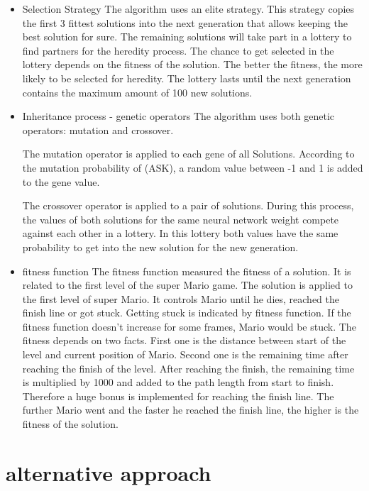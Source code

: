 \documentclass[a4paper]{article}
\begin{document}
\begin{itemize}

\item{Selection Strategy}
The algorithm uses an elite strategy. This strategy copies the first 3 fittest solutions into the next generation that allows keeping the best solution for sure. The remaining solutions will take part in a lottery to find partners for the heredity process. The chance to get selected in the lottery depends on the fitness of the solution. The better the fitness, the more likely to be selected for heredity. The lottery lasts until the next generation contains the maximum amount of 100 new solutions.


\item{Inheritance process - genetic operators}
The algorithm uses both genetic operators: mutation and crossover.

The mutation operator is applied to each gene of all Solutions. According to the mutation probability of (ASK), a random value between -1 and 1 is added to the gene value.

The crossover operator is applied to a pair of solutions. During this process, the values of both solutions for the same neural network weight compete against each other in a lottery. In this lottery both values have the same probability to get into the new solution for the new generation.

\item{fitness function}
The fitness function measured the fitness of a solution. It is related to the first level of the super Mario game. The solution is applied to the first level of super Mario. It controls Mario until he dies, reached the finish line or got stuck. Getting stuck is indicated by fitness function. If the fitness function doesn’t increase for some frames, Mario would be stuck. The fitness depends on two facts. First one is the distance between start of the level and current position of Mario. Second one is the remaining time after reaching the finish of the level. After reaching the finish, the remaining time is multiplied by 1000 and added to the path length from start to finish. Therefore a huge bonus is implemented for reaching the finish line. The further Mario went and the faster he reached the finish line, the higher is the fitness of the solution.

\end{itemize}



\section{alternative approach}
\end{document}
